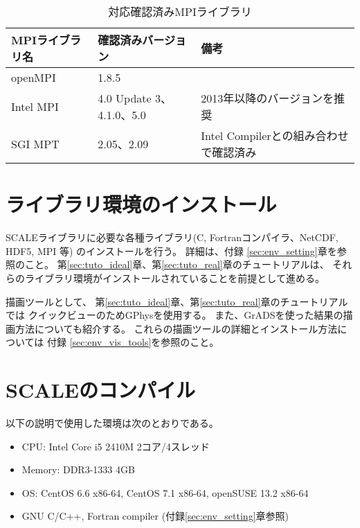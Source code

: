 \begin{table}[htb]
\begin{center}
\caption{対応確認済みMPIライブラリ}
\begin{tabularx}{150mm}{|l|l|X|} \hline
 \rowcolor[gray]{0.9} MPIライブラリ名 & 確認済みバージョン & 備考 \\ \hline
 openMPI   & 1.8.5                    & \\ \hline
 Intel MPI & 4.0 Update 3、4.1.0、5.0 & 2013年以降のバージョンを推奨 \\ \hline
 SGI MPT   & 2.05、2.09               & Intel Compilerとの組み合わせで確認済み \\ \hline
\end{tabularx}
\label{tab:compatible_mpi}
\end{center}
\end{table}



\section{ライブラリ環境のインストール}
\label{sec:inst_env}
SCALEライブラリに必要な各種ライブラリ(C, Fortranコンパイラ、NetCDF, HDF5, MPI 等)
のインストールを行う。
詳細は、付録 \ref{sec:env_setting}章を参照のこと。
第\ref{sec:tuto_ideal}章、第\ref{sec:tuto_real}章のチュートリアルは、
それらのライブラリ環境がインストールされていることを前提として進める。

描画ツールとして、
第\ref{sec:tuto_ideal}章、第\ref{sec:tuto_real}章のチュートリアルでは
クイックビューのためGPhysを使用する。
また、GrADSを使った結果の描画方法についても紹介する。
これらの描画ツールの詳細とインストール方法については
付録 \ref{sec:env_vis_tools}を参照のこと。



\section{SCALEのコンパイル} \label{sec:source_code}

以下の説明で使用した環境は次のとおりである。
\begin{itemize}
\item CPU: Intel Core i5 2410M 2コア/4スレッド
\item Memory: DDR3-1333 4GB
\item OS: CentOS 6.6 x86-64, CentOS 7.1 x86-64, openSUSE 13.2 x86-64
\item GNU C/C++, Fortran compiler (付録\ref{sec:env_setting}章参照)
\end{itemize}

